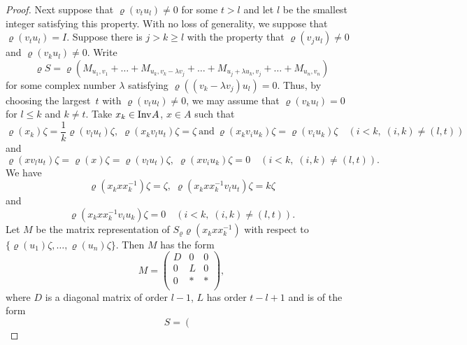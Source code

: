 \documentclass[a4paper,12pt,reqno]{amsart}
\numberwithin{equation}{section}
\theoremstyle{definition}
\begin{document}
\begin{proof}
Next suppose that $\varrho(v_t u_l)\neq 0$  for some $t >l$ and let $l$ be the smallest integer satisfying this property.
With no loss of generality, we suppose that $\varrho(v_tu_l)= I$. Suppose there is $j > k \geq l$ with the property that
$\varrho(v_j u_l )\neq 0$ and $\varrho(v_k u_l) \neq 0$. Write
\begin{equation*}
\varrho{S}= \varrho (M_{u_1,v_1}+\ldots+M_{u_k,v_k- \lambda v_j}+\ldots +M_{u_j+ \lambda u_k,v_j}+ \ldots + M_{u_n,v_n})
\end{equation*}
for some complex number $\lambda$ satisfying $\varrho ((v_k- \lambda v_j)u_l)=0$.
Thus, by choosing the largest~$t$ with $\varrho(v_t u_l) \neq 0$, we may assume that $\varrho(v_k u_l) =0$ for $l \leq k $ and $k \neq t$.
Take $x_k \in{{\textup{Inv}\kern.5pt A}}$, $x\in A$ such that
\begin{equation*}
\varrho( x_k )\zeta= \frac{1}{k} \varrho(v_l u_t )\zeta,   \; \varrho(x_k v_l u_t) \zeta= \zeta \ \text{and} \
\varrho(x_k v_i u_k) \zeta =\varrho(v_i u_k)\zeta \quad(i <k,\; (i,k) \neq (l,t))
\end{equation*}
and
\begin{equation*}
\varrho(x v_l u_t) \zeta=  \varrho(x) \zeta=   \varrho(v_l u_t) \zeta, \; \varrho(x v_i u_k) \zeta=0\quad(i <k,\; (i,k) \neq (l,t)).
\end{equation*}
We have
\begin{equation*}
\varrho( x_k^{} x x_k^{-1}) \zeta= \zeta, \; \varrho(x_k^{} x x_k^{-1} v_l u_t) \zeta= k \zeta
\end{equation*}
and
\begin{equation*}
\varrho(x_k{} x x_k^{-1} v_i u_k) \zeta=0\quad(i <k,\; (i,k) \neq (l,t)).
\end{equation*}
Let $M$ be  the matrix representation of $S_\varrho\varrho(x_k^{} x x_k^{-1})$ with respect to $\{\varrho(u_1)\zeta,\ldots,\varrho(u_n)\zeta\}$.
Then $M$ has the form
\begin{equation*}
 M=   \left(
        \begin{array}{ccc}
          D & 0 & 0\\
          0 & L & 0 \\
          0 & * & * \\
        \end{array}
      \right),
\end{equation*}
where $D$ is a diagonal matrix of order $l-1$, $L$ has order $t-l+1$ and is of the form
\begin{equation*}
S=   \left(
      \begin{array}{ccccccc}

\end{array}
\end{equation*}
\end{proof}
\end{document}

